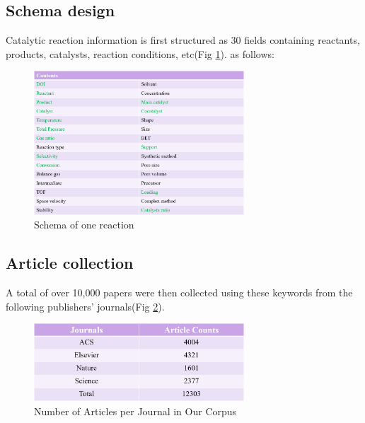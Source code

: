 \documentclass[%
 aip,
 jmp,%
 amsmath,amssymb,
 reprint,%
]{revtex4-2}
\begin{document}
\subsection{Schema design}
Catalytic reaction information is first structured as 30 fields containing reactants, products, catalysts, reaction conditions, etc(Fig \ref{ Fig.5 }). as follows:
\begin{figure}[htbp]
 \centering
 \includegraphics[width=0.7\textwidth]{figure/5.png}
 \caption{ Schema of one reaction }
 \label{ Fig.5 }
\end{figure}
\subsection{Article collection}
A total of over 10,000 papers were then collected using these keywords from the following publishers' journals(Fig \ref{ Fig.6 }).
\begin{figure}[htbp]
 \centering
 \includegraphics[width=0.7\textwidth]{figure/6.png}
 \caption{ Number of Articles per Journal in Our Corpus }
 \label{ Fig.6 }
\end{figure}
\end{document}
